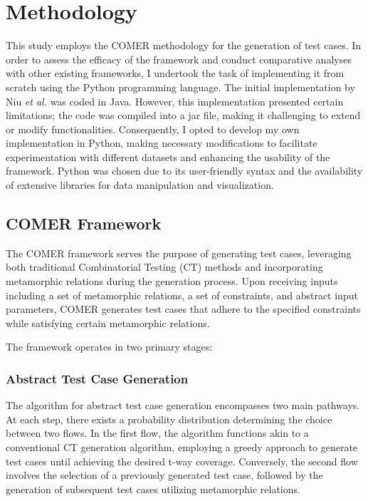 \chapter{Methodology}
\label{chap:met}

This study employs the COMER methodology for the generation of test cases. In order to assess the efficacy of the framework and conduct comparative analyses with other existing frameworks, I undertook the task of implementing it from scratch using the Python programming language. The initial implementation by Niu \textit{et al.} \cite{comer} was coded in Java. However, this implementation presented certain limitations; the code was compiled into a jar file, making it challenging to extend or modify functionalities. Consequently, I opted to develop my own implementation in Python, making necessary modifications to facilitate experimentation with different datasets and enhancing the usability of the framework. Python was chosen due to its user-friendly syntax and the availability of extensive libraries for data manipulation and visualization.

\section{COMER Framework}

The COMER framework serves the purpose of generating test cases, leveraging both traditional Combinatorial Testing (CT) methods and incorporating metamorphic relations during the generation process. Upon receiving inputs including a set of metamorphic relations, a set of constraints, and abstract input parameters, COMER generates test cases that adhere to the specified constraints while satisfying certain metamorphic relations.

The framework operates in two primary stages:

\subsection{Abstract Test Case Generation}

The algorithm for abstract test case generation encompasses two main pathways. At each step, there exists a probability distribution determining the choice between two flows. In the first flow, the algorithm functions akin to a conventional CT generation algorithm, employing a greedy approach to generate test cases until achieving the desired t-way coverage. Conversely, the second flow involves the selection of a previously generated test case, followed by the generation of subsequent test cases utilizing metamorphic relations.

